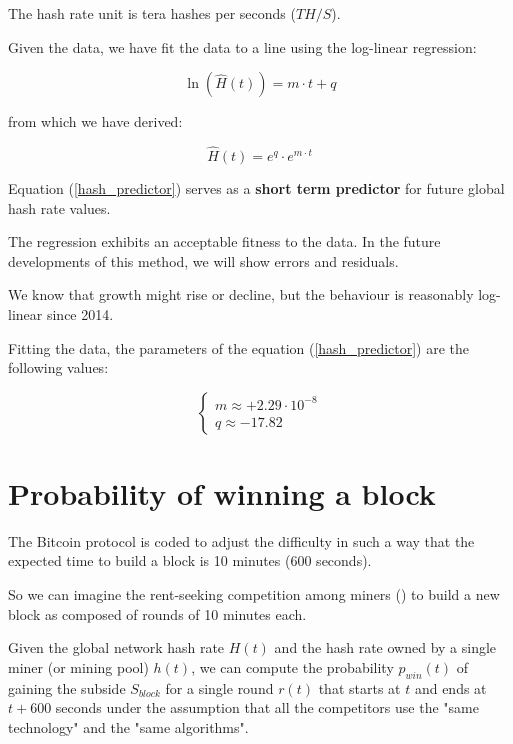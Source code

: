 \documentclass{book}
\theoremstyle{definition}
\begin{document}
The hash rate unit is tera hashes per seconds ($TH/S$).

Given the data, we have fit the data to a line using the log-linear regression:

\begin{equation}
    \ln(\widehat{H}(t)) = m \cdot t + q  \label{eq1}
\end{equation}

from which we have derived:

\begin{equation}
    \widehat{H}(t) = e^{q} \cdot e^{m \cdot t} \label{hash_predictor}
\end{equation}

Equation (\ref{hash_predictor}) serves as a \textbf{short term predictor} for future global hash rate values.

The regression exhibits an acceptable fitness to the data. In the future developments of this method, we will show errors and residuals.

We know that growth might rise or decline, but the behaviour is reasonably log-linear since 2014.

Fitting the data, the parameters of the equation (\ref{hash_predictor}) are the following values:

\begin{equation}
    \left \{
        \begin{array}{ll}
            m \approx +2.29 \cdot 10^{-8} \\
            q \approx -17.82
        \end{array}
    \right. \label{values}
\end{equation}

\section{Probability of winning a block}

The Bitcoin protocol is coded to adjust the difficulty in such a way that the expected time to build a block is 10 minutes (600 seconds).

So we can imagine the rent-seeking competition among miners (\cite{theEconomicLimits}) to build a new block as composed of rounds of 10 minutes each.

Given the global network hash rate $H(t)$ and the hash rate owned by a single miner (or mining pool) $h(t)$, we can compute the probability $p_{win}(t)$ of gaining the subside $S_{block}$ for a single round $r(t)$ that starts at $t$ and ends at $t+600$ seconds under the assumption that all the competitors use the "same technology" and the "same algorithms".
\end{document}
